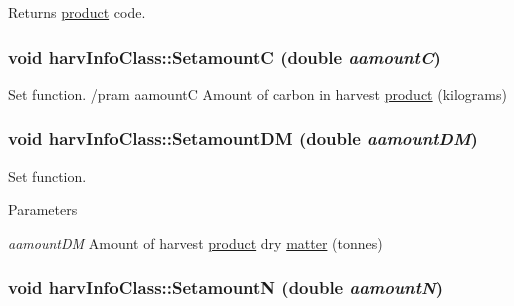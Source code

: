 Returns \hyperlink{classproduct}{product} code. \hypertarget{classharv_info_class_a2a061c57df6018ca45d0b08d76e78398}{
\subsubsection[{SetamountC}]{\setlength{\rightskip}{0pt plus 5cm}void harvInfoClass::SetamountC (double {\em aamountC})}}
\label{classharv_info_class_a2a061c57df6018ca45d0b08d76e78398}


Set function. /pram aamountC Amount of carbon in harvest \hyperlink{classproduct}{product} (kilograms) \hypertarget{classharv_info_class_a65627109413ccce8e91f747a63d8bbad}{
\subsubsection[{SetamountDM}]{\setlength{\rightskip}{0pt plus 5cm}void harvInfoClass::SetamountDM (double {\em aamountDM})}}
\label{classharv_info_class_a65627109413ccce8e91f747a63d8bbad}


Set function. 
\begin{DoxyParams}{Parameters}
\item[{\em aamountDM}]Amount of harvest \hyperlink{classproduct}{product} dry \hyperlink{classmatter}{matter} (tonnes) \end{DoxyParams}
\hypertarget{classharv_info_class_a903f84ea29f54cdbca6df9661a6db9b5}{
\subsubsection[{SetamountN}]{\setlength{\rightskip}{0pt plus 5cm}void harvInfoClass::SetamountN (double {\em aamountN})}}
\label{classharv_info_class_a903f84ea29f54cdbca6df9661a6db9b5}


